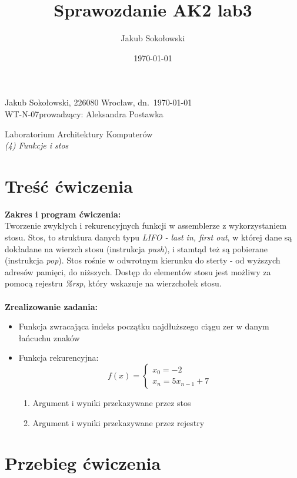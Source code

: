 \documentclass[11pt]{report}
\title{Sprawozdanie AK2 lab3}
\date{\today}
\author{Jakub Sokołowski}
\newcommand{\LabNum}{4}
\begin{document}
\noindent
Jakub Sokołowski, 226080
  \hfill Wrocław, dn.\ {\AdvanceDate[-1]\today}\\
WT-N-07\hfill  prowadzący: Aleksandra Postawka\\
\vspace{1cm}
\begin{center}
  \begin{Large}
  	Laboratorium Architektury Komputerów\\
    \emph{(\LabNum) Funkcje i stos\\}
  \end{Large}
\end{center}


\section{Treść ćwiczenia}
\label{sec:tresc-cwiczenia}
\textbf{Zakres i program ćwiczenia:}\\
Tworzenie zwykłych i rekurencyjnych funkcji w assemblerze z wykorzystaniem stosu. Stos, to struktura danych typu \textit{LIFO - last in, first out}, w której dane są dokładane na wierzch stosu (instrukcja \textit{push}), i stamtąd też są pobierane (instrukcja \textit{pop}). Stos rośnie w odwrotnym kierunku do sterty - od wyższych adresów pamięci, do niższych. Dostęp do elementów stosu jest możliwy za pomocą rejestru \textit{\%rsp}, który wskazuje na wierzchołek stosu.\\\\
\textbf{Zrealizowanie zadania:}
\begin{itemize}[leftmargin=*,topsep=0pt]
	\item{Funkcja zwracająca indeks początku najdłuższego ciągu zer w danym łańcuchu znaków}
	\item{Funkcja rekurencyjna:
	\[
    f(x)=\left\{
                \begin{array}{ll}
                  x_0 = -2\\
                  x_n = 5x_{n-1} + 7
                \end{array}
              \right.
  \]
  	\begin{enumerate}[label=(\alph*)]
  		\item{Argument i wyniki przekazywane przez stos}
  		\item{Argument i wyniki przekazywane przez rejestry}
  	\end{enumerate}
  	}
\end{itemize}
\newpage
\section{Przebieg ćwiczenia}
\end{document}
